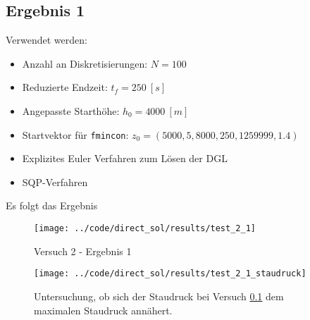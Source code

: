 \subsection{Ergebnis 1}\label{kap:Versuch21}
Verwendet werden:
\begin{itemize}
\item Anzahl an Diskretisierungen: $N = 100$ 
\item Reduzierte Endzeit: $t_f = 250 \ [s]$
\item Angepasste Starthöhe: $h_0 = 4000 \ [m]$
\item Startvektor für \texttt{fmincon}: $z_0 = (5000,5,8000,250,1259999,1.4)$
\item Explizites Euler Verfahren zum Lösen der DGL
%
\item SQP-Verfahren
\end{itemize}
Es folgt das Ergebnis
\begin{figure}[H]
\begin{center}
\texttt{[image: ../code/direct\_sol/results/test\_2\_1]}
\caption{Versuch 2 - Ergebnis 1}\label{img:test_2_1}
\end{center}
\end{figure}

\begin{figure}[H]
\begin{center}
\texttt{[image: ../code/direct\_sol/results/test\_2\_1\_staudruck]}
\caption{Untersuchung, ob sich der Staudruck bei Versuch \ref{kap:Versuch21} dem maximalen Staudruck annähert.}\label{img:test_2_1_staudruck}
\end{center}
\end{figure}
